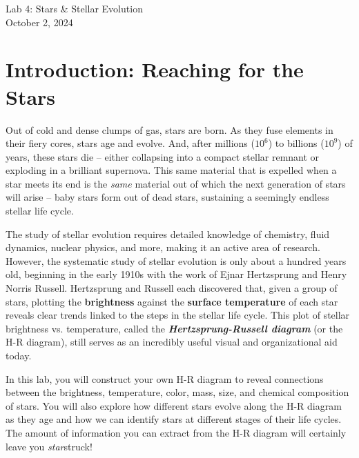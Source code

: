 \documentclass[11pt]{article}
\begin{document}
\begin{center}
\huge{Lab 4: Stars \& Stellar Evolution}\\ \medskip \Large{October 2, 2024}
\end{center}

\section{Introduction: Reaching for the Stars}

Out of cold and dense clumps of gas, stars are born. As they fuse elements in their fiery cores, stars age and evolve. And, after millions ($10^6$) to billions ($10^9$) of years, these stars die -- either collapsing into a compact stellar remnant or exploding in a brilliant supernova. This same material that is expelled when a star meets its end is the \emph{same} material out of which the next generation of stars will arise -- baby stars form out of dead stars, sustaining a seemingly endless stellar life cycle.  

The study of stellar evolution requires detailed knowledge of chemistry, fluid dynamics, nuclear physics, and more, making it an active area of research. However, the systematic study of stellar evolution is only about a hundred years old, beginning in the early 1910s with the work of Ejnar Hertzsprung and Henry Norris Russell. Hertzsprung and Russell each discovered that, given a group of stars, plotting the \textbf{brightness} against the \textbf{surface temperature} of each star reveals clear trends linked to the steps in the stellar life cycle. This plot of stellar brightness vs. temperature, called the \textbf{\emph{Hertzsprung-Russell diagram}} (or the H-R diagram), still serves as an incredibly useful visual and organizational aid today.

In this lab, you will construct your own H-R diagram to reveal connections between the brightness, temperature, color, mass, size, and chemical composition of stars. You will also explore how different stars evolve along the H-R diagram as they age and how we can identify stars at different stages of their life cycles. The amount of information you can extract from the H-R diagram will certainly leave you \emph{star}struck!
\end{document}

